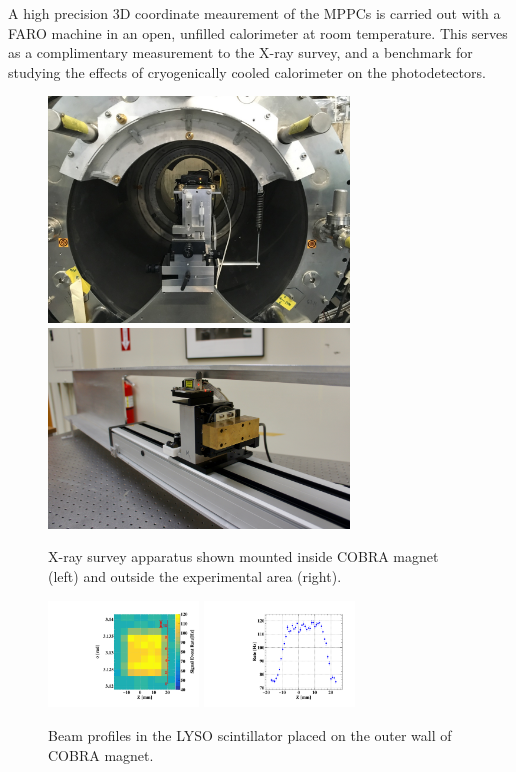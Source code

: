 A high precision 3D coordinate meaurement of the MPPCs is carried out with a
FARO machine \cite{faro} in an open, unfilled calorimeter at room temperature.
This serves as a complimentary measurement to the X-ray survey, and a benchmark
for studying the effects of cryogenically cooled calorimeter on the
photodetectors.
\begin{figure}[]
\includegraphics[width=8cm]{plots/photo4}
\includegraphics[width=8cm]{plots/photo3}
\caption{X-ray survey apparatus shown mounted inside COBRA magnet
  (left) and outside the experimental area (right).}
\label{fig:photo}
\end{figure}  

\begin{figure}[]
\includegraphics[width=4cm]{plots/xray_lyso.pdf}
\includegraphics[width=4cm]{plots/xray_lyso3_jun5.pdf}
\caption{Beam profiles in the LYSO scintillator placed on the outer
  wall of COBRA magnet.}
\label{fig:beamprofile}
\end{figure}  

